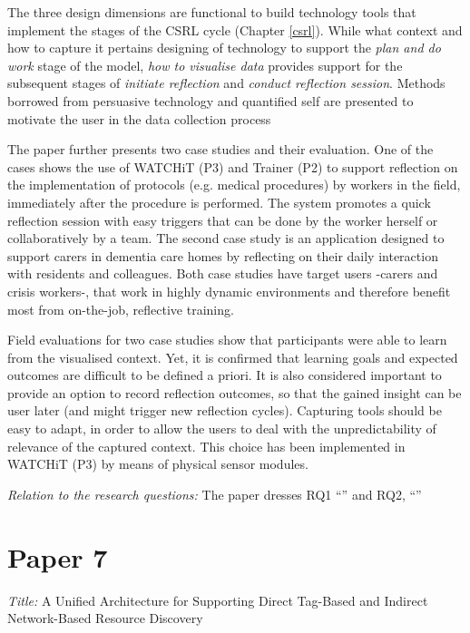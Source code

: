 The three design dimensions are functional to build technology tools that implement the stages of the CSRL cycle (Chapter \ref{csrl}). While what context and how to capture it pertains designing of technology to support the \emph{plan and do work} stage of the model, \emph{how to visualise data} provides support for the subsequent stages of \emph{initiate reflection} and \emph{conduct reflection session}. Methods borrowed from persuasive technology and quantified self are presented to motivate the user in the data collection process

The paper further presents two case studies and their evaluation. One of the cases shows the use of WATCHiT (P3) and Trainer (P2) to support reflection on the implementation of protocols (e.g. medical procedures) by workers in the field, immediately after the procedure is performed. The system promotes a quick reflection session with easy triggers that can be done by the worker herself or collaboratively by a team. The second case study is an application designed to support carers in dementia care homes by reflecting on their daily interaction with residents and colleagues. Both case studies have target users -carers and crisis workers-, that work in highly dynamic environments and therefore benefit most from on-the-job, reflective training.

Field evaluations for two case studies show that participants were able to learn from the visualised context. Yet, it is confirmed that learning goals and expected outcomes are difficult to be defined a priori. It is also considered important to provide an option to record reflection outcomes, so that the gained insight can be user later (and might trigger new reflection cycles). Capturing tools should be easy to adapt, in order to allow the users to deal with the unpredictability of relevance of the captured context. This choice has been implemented in WATCHiT (P3) by means of physical sensor modules.

\emph{Relation to the research questions: } The paper dresses RQ1 ``\RQi'' and RQ2, ``\RQii''


\section[P7: A Unified Architecture for Supporting Direct Tag-Based and Indirect Network-Based Resource Discovery]{Paper 7}\label{paper-7}

\emph{Title:} A Unified Architecture for Supporting Direct Tag-Based and Indirect Network-Based Resource Discovery

